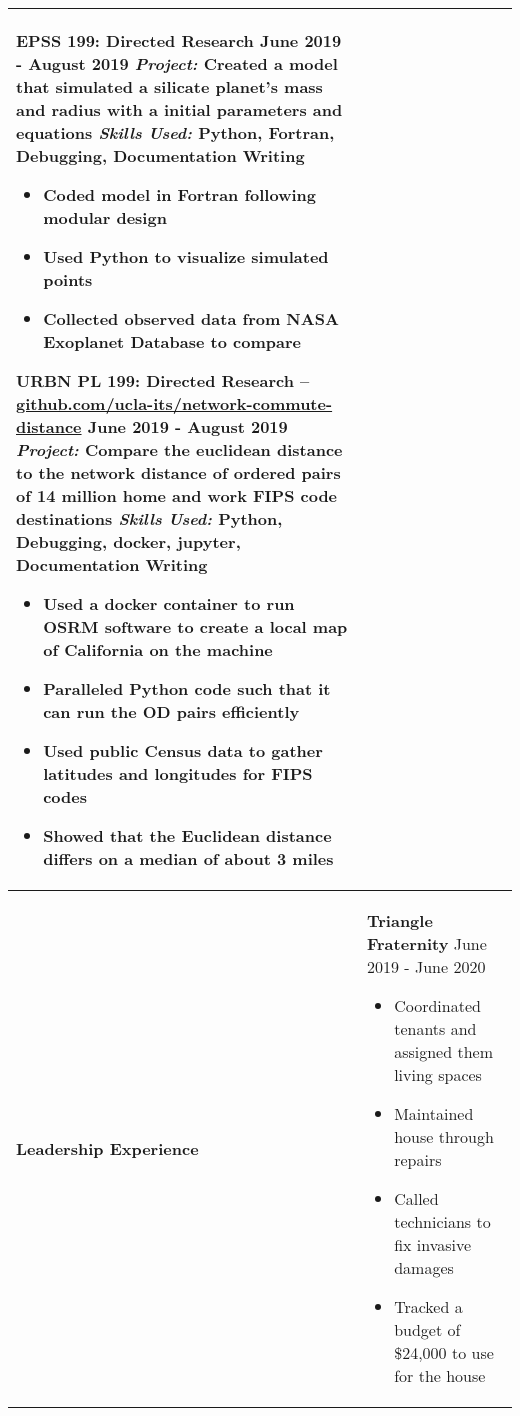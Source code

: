 \documentclass[10pt]{article}
\newcommand*\leftright[2]{%
  \leavevmode
  \rlap{#1}%
  \hspace{0.5\linewidth}%
  #2}
\begin{document}
\begin{longtable}{l l l l}
{        \textbf{EPSS 199: Directed Research} \newline
        \leftright{\textit{Advisor:} Lars Stixrude}{June 2019 - August 2019} \newline
        \textit{Project:} Created a model that simulated a silicate planet's mass and radius with a initial parameters and equations \newline
        \textit{Skills Used:} Python, Fortran, Debugging, Documentation Writing
        \begin{itemize}[noitemsep,nolistsep]
            \item Coded model in Fortran following modular design
            \item Used Python to visualize simulated points
            \item Collected observed data from NASA Exoplanet Database to compare
        \end{itemize}
        
        \textbf{URBN PL 199: Directed Research -- 
        \href{https://github.com/ucla-its/network-commute-distance}{github.com/ucla-its/network-commute-distance}} \newline
        \leftright{\textit{Advisor:} Evelyn Blumenberg}{June 2019 - August 2019} \newline
        \textit{Project:} Compare the euclidean distance to the network distance of ordered pairs of 14 million home and work FIPS code destinations \newline
        \textit{Skills Used:} Python, Debugging, docker, jupyter, Documentation Writing
        \begin{itemize}[noitemsep,nolistsep]
            \item Used a docker container to run OSRM software to create a local map of California on the machine
            \item Paralleled Python code such that it can run the OD pairs efficiently
            \item Used public Census data to gather latitudes and longitudes for FIPS codes
            \item Showed that the Euclidean distance differs on a median of about 3 miles
        \end{itemize}
        
        \baselineskip} \\ \hline
    \multicolumn{1}{p{2 cm}}{\textbf{Leadership \newline Experience}}  &
        \multicolumn{3}{p{16cm}}{
        \textbf{Triangle Fraternity} \newline
        \leftright{\textit{House Manager}}{June 2019 - June 2020}
        \begin{itemize}[noitemsep,nolistsep]
            \item Coordinated tenants and assigned them living spaces
            \item Maintained house through repairs
            \item Called technicians to fix invasive damages
            \item Tracked a budget of \$24,000 to use for the house
        \end{itemize}
        
}
\end{longtable}
\end{document}
